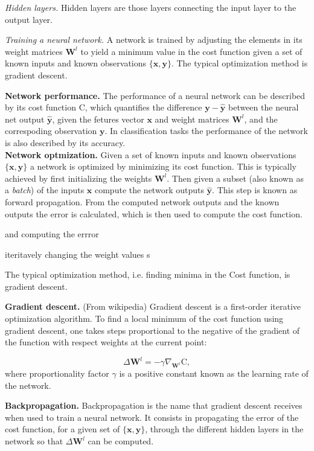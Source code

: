 \documentclass[11pt,onecolumn]{article}
\begin{document}
\textit{Hidden layers.} Hidden layers are those layers connecting the input layer to the output layer.

\textit{Training a neural network.}  A network is trained by adjusting the elements in its weight matrices $\mathbf{W}^{l}$ to yield a minimum value in the cost function given a set of known inputs and known observations $\{\mathbf{x},\mathbf{y}\}$. The typical optimization method is gradient descent.  

  
\textbf{Network performance.} The performance of a neural network can be described by its cost function $\mathrm{C}$, which quantifies the difference $\mathbf{y} - \mathbf{\hat{y}}$ between the neural net output $\mathbf{\hat{y}}$, given the fetures vector $\mathbf{x}$ and weight matrices $\mathbf{W}^{l}$, and the correspoding observation $\mathbf{y}$. In classification tasks the performance of the network is also described by its accuracy. \\

\textbf{Network optmization.} Given a set of known inputs and known observations $\{\mathbf{x},\mathbf{y}\}$ a network is optimized by minimizing its cost function. This is typically achieved by first initializing the weights $\mathbf{W}^{l}$. Then given a subset (also known as a \textit{batch}) of the inputs $\mathbf{x}$ compute the network outputs $\mathbf{\hat{y}}$. This step is known as forward propagation. From the computed network outputs and the known outputs the error is calculated, which is then used to compute the cost function.   

and computing the errror  


 iteritavely changing the weight values s

The typical optimization method, i.e. finding minima in the Cost function, is gradient descent. 

\textbf{Gradient descent.} (From wikipedia) Gradient descent is a first-order iterative optimization algorithm. To find a local minimum of the cost function using gradient descent, one takes steps proportional to the negative of the gradient of the function with respect weights at the current point:

\begin{equation}
	\Delta \mathbf{W}^{l} = - \gamma \nabla_{\mathbf{W}^{l}} \mathrm{C},
\end{equation}
where proportionality factor $\gamma$ is a positive constant known as the learning rate of the network. 

\textbf{Backpropagation.} Backpropagation is the name that gradient descent receives when used to train a neural network. It consists in propagating the error of the cost function, for a given set of $\{\mathbf{x},\mathbf{y}\}$, through the different hidden layers in the network so that $\Delta \mathbf{W}^{l}$ can be computed.
\end{document}
